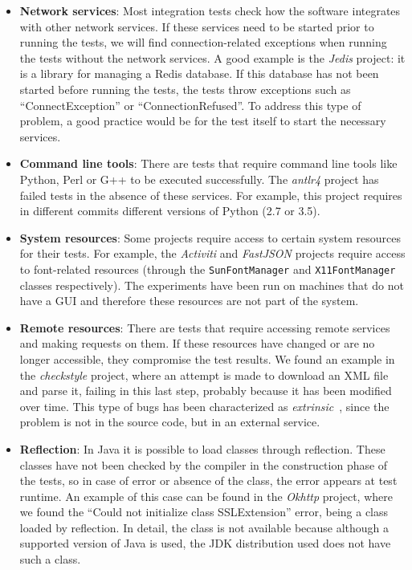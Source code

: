 \begin{itemize}
    \item \textbf{Network services}: 
    Most integration tests check how the software integrates with other network services. If these services need to be started prior to running the tests, we will find connection-related exceptions when running the tests without the network services.
    A good example is the \textit{Jedis} project: it is a library for managing a Redis database. 
    If this database has not been started before running the tests, the tests throw exceptions such as ``ConnectException'' or ``ConnectionRefused''.
    To address this type of problem, a good practice would be for the test itself to start the necessary services.
    \item \textbf{Command line tools}: 
    There are tests that require command line tools like Python, Perl or G++ to be executed successfully. 
    The \textit{antlr4} project has failed tests in the absence of these services. 
    For example, this project requires in different commits different versions of Python (2.7 or 3.5).
    \item \textbf{System resources}: 
    Some projects require access to certain system resources for their tests. 
    For example, the \textit{Activiti} and \textit{FastJSON} projects require access to font-related resources (through the \texttt{SunFontManager} and \texttt{X11FontManager} classes respectively). 
    The experiments have been run on machines that do not have a GUI and therefore these resources are not part of the system.
    \item \textbf{Remote resources}: 
    There are tests that require accessing remote services and making requests on them. 
    If these resources have changed or are no longer accessible, they compromise the test results. 
    We found an example in the \textit{checkstyle} project, where an attempt is made to download an XML file and parse it, failing in this last step, probably because it has been modified over time.
    This type of bugs has been characterized as \textit{extrinsic}~\cite{rodriguez2020bugs,rodriguezperez2020watch,rodriguez2018if}, since the problem is not in the source code, but in an external service.
    \item \textbf{Reflection}: 
    In Java it is possible to load classes through reflection. 
    These classes have not been checked by the compiler in the construction phase of the tests, so in case of error or absence of the class, the error appears at test runtime. 
    An example of this case can be found in the \textit{Okhttp} project, where we found the ``Could not initialize class SSLExtension'' error, being a class loaded by reflection.
    In detail, the class is not available because although a supported version of Java is used, the JDK distribution used does not have such a class.
\end{itemize}

